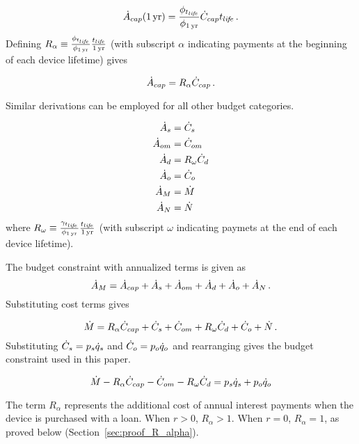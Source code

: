 \begin{equation}
  \dot{A}_{cap} (1\,\mathrm{yr}) = \frac{\phi_{t_{li\!f\!e}}}{\phi_{1\,\mathrm{yr}}} \dot{C}_{cap} t_{li\!f\!e} \, .
\end{equation}
%
Defining $R_\alpha \equiv \frac{\phi_{t_{li\!f\!e}}}{\phi_{1\,\mathrm{yr}}} \frac{t_{li\!f\!e}}{1\,\mathrm{yr}}$ 
(with subscript $\alpha$ indicating payments at the beginning of each 
device lifetime) gives

\begin{equation}
  \dot{A}_{cap} = R_\alpha \dot{C}_{cap} \, .
\end{equation}

Similar derivations can be employed for all other budget categories.

\begin{align}
  \dot{A}_s &= \dot{C}_s \\
  \dot{A}_{om} &= \dot{C}_{om} \\
  \dot{A}_d &= R_\omega \dot{C}_d \\
  \dot{A}_o &= \dot{C}_o \\
  \dot{A}_M &= \dot{M} \\
  \dot{A}_N &= \dot{N}
\end{align}
%
where $R_\omega \equiv \frac{\gamma_{t_{li\!f\!e}}}{\phi_{1\,\mathrm{yr}}} \frac{t_{li\!f\!e}}{1\,\mathrm{yr}}$
(with subscript $\omega$ indicating paymets at the end of each device lifetime).

The budget constraint with annualized terms is given as
%
\begin{equation}
  \dot{A}_M = \dot{A}_{cap} + 
               \dot{A}_s + 
               \dot{A}_{om} + 
               \dot{A}_d + 
               \dot{A}_o + 
               \dot{A}_N \, .
\end{equation}
%
Substituting cost terms gives

\begin{equation}
  \dot{M} = R_\alpha \dot{C}_{cap} + 
             \dot{C}_s + 
             \dot{C}_{om} + 
             R_\omega \dot{C}_d + 
             \dot{C}_o + 
             \dot{N} \, .
\end{equation}
%
Substituting $\dot{C}_s = p_s \dot{q}_s$ and 
$\dot{C}_o = p_o \dot{q}_o$ and rearranging gives
the budget constraint used in this paper.

\begin{equation}
  \dot{M} - R_\alpha \dot{C}_{cap} - \dot{C}_{om} - R_\omega \dot{C}_d = p_s \dot{q}_s + p_o \dot{q}_o
\end{equation}

The term $R_\alpha$ represents the additional cost of annual interest
payments when the device is purchased with a loan.
When $r > 0$, $R_\alpha > 1$.
When $r = 0$, $R_\alpha = 1$, as proved below
(Section~\ref{sec:proof_R_alpha}).

